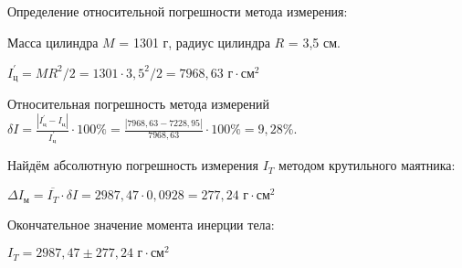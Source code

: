 
Определение относительной погрешности метода измерения:

Масса цилиндра $M$ = 1301 г, радиус цилиндра $R$ = 3,5 см.

$I_\text{ц}^{'} = MR^2 / 2 = 1301 \cdot 3,5^2 / 2 = 7968,63 \text{ г} \cdot \text{см}^2$

Относительная погрешность метода измерений $\delta I = \frac{|I_\text{ц}^{'} - I_\text{ц}|}{I_\text{ц}^{'}} \cdot 100 \% =
\frac{|7968,63 - 7228,95|}{7968,63} \cdot 100 \% = 9,28 \%. $

Найдём абсолютную погрешность измерения $I_T$ методом крутильного маятника:

$\Delta I_\text{м} = \overline{I_T} \cdot \delta I = 2987,47 \cdot 0,0928 = 277,24 \text{ г} \cdot \text{см}^2$

Окончательное значение момента инерции тела:

$I_T = 2987,47 \pm 277,24 \text{ г} \cdot \text{см}^2$
